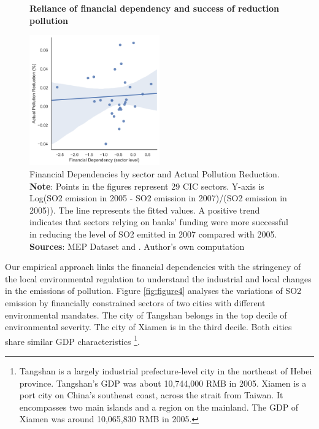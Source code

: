 \documentclass[12pt]{article}
\begin{document}
\begin{figure}[ht]
    \centering
    \textbf{Reliance of financial dependency and success of reduction pollution}\par\medskip
    \includegraphics[width=0.5\textwidth]{fig_3}
    \caption{Financial Dependencies by sector and Actual Pollution Reduction. \textbf{Note}: Points in the figures represent 29 CIC sectors. Y-axis is Log(SO2 emission in 2005 - SO2 emission in 2007)/(SO2 emission in 2005)). The line represents the fitted values. A positive trend indicates that sectors relying on banks’ funding were more successful in reducing the level of SO2 emitted in 2007 compared with 2005. \\
    \textbf{Sources}: MEP Dataset and \cite{Fan2015-bm}. Author's own computation}
    \label{fig:figure3}
\end{figure}

Our empirical approach links the financial dependencies with the stringency of the local environmental regulation to understand the industrial and local changes in the emissions of pollution. Figure \ref{fig:figure4} analyses the variations of SO2 emission by financially constrained sectors of two cities with different environmental mandates. The city of Tangshan belongs in the top decile of environmental severity. The city of Xiamen is in the third decile. Both cities share similar GDP characteristics \footnote{Tangshan is a largely industrial prefecture-level city in the northeast of Hebei province. Tangshan’s GDP was about 10,744,000 RMB in 2005. Xiamen is a port city on China’s southeast coast, across the strait from Taiwan. It encompasses two main islands and a region on the mainland. The GDP of Xiamen was around 10,065,830 RMB in 2005.}.
\end{document}
